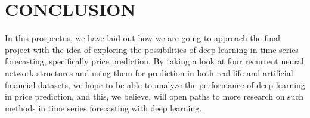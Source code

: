 \documentclass[letterpaper, 10 pt, conference]{ieeeconf}  %
\begin{document}
\section{CONCLUSION}
    In this prospectus, we have laid out how we are going to approach the final project with the idea of exploring the possibilities of deep learning in time series forecasting, specifically price prediction. By taking a look at four recurrent neural network structures and using them for prediction in both real-life and artificial financial datasets, we hope to be able to analyze the performance of deep learning in price prediction, and this, we believe, will open paths to more research on such methods in time series forecasting with deep learning. 

\cite{PURUSHOTHAM2018112}



\end{document}
